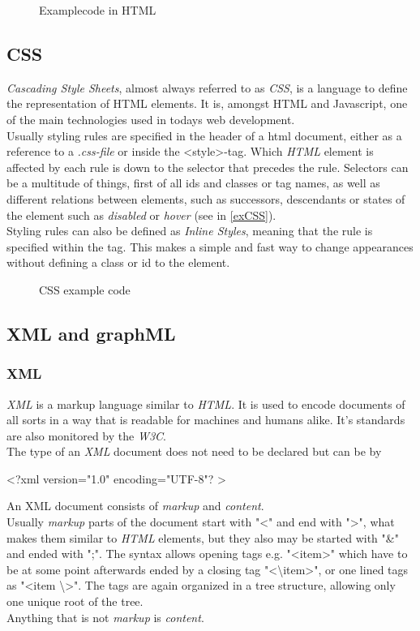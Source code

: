\begin{figure}[!h]

\caption{Examplecode in HTML}
\label{exHTML}
\end{figure}

\subsection{CSS}
\textit{Cascading Style Sheets}, almost always referred to as \textit{CSS}, is a language to define the representation of HTML elements. It is, amongst HTML and Javascript, one of the main technologies used in todays web development.\\
Usually styling rules are specified in the header of a html document, either as a reference to a \textit{.css-file} or inside the \textless  style\textgreater-tag. Which \textit{HTML} element is affected by each rule is down to the selector that precedes the rule. Selectors can be a multitude of things, first of all ids and classes or tag names, as well as different relations between elements, such as successors, descendants or states of the element such as \textit{disabled} or \textit{hover} (see in \autoref{exCSS}).\\
Styling rules can also be defined as \textit{Inline Styles}, meaning that the rule is specified within the tag. This makes a simple and fast way to change appearances without defining a class or id to the element.

\begin{figure}[!h]

\caption{CSS example code}
\label{exCSS}
\end{figure}

\subsection{XML and graphML}
\subsubsection{XML}
\textit{XML} is a markup language similar to \textit{HTML}. It is used to encode documents of all sorts in a way that is readable for machines and humans alike. 
It's standards are also monitored by the \textit{W3C}.\\
The type of an \textit{XML} document does not need to be declared but can be by
\begin{center}
\textless  ?xml version="1.0" encoding="UTF-8"? \textgreater
\end{center}
An XML document consists of \textit{markup} and \textit{content}.\\
Usually \textit{markup} parts of the document start with "\textless " and end with "\textgreater", what makes them similar to \textit{HTML} elements, but they also may be started with "\&" and ended with ";". The syntax allows opening tags e.g. "\textless  item\textgreater" which have to be at some point afterwards ended by a closing tag "\textless  \textbackslash item\textgreater", or one lined tags as "\textless  item \textbackslash \textgreater". The tags are again organized in a tree structure, allowing only one unique root of the tree.\\
Anything that is not \textit{markup} is \textit{content}.
